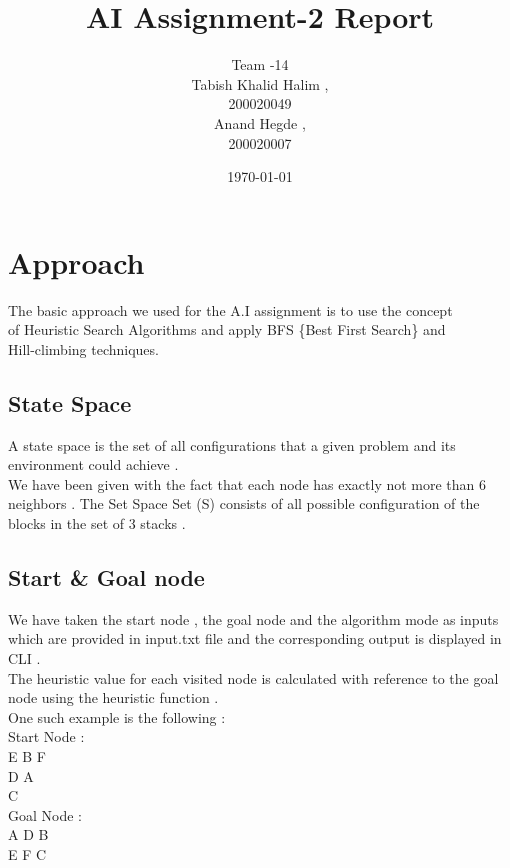 \documentclass{article}
\title{AI Assignment-2 Report}
\date{\today}
\author{Team -14 \\Tabish Khalid Halim , \\ 200020049 \\ Anand Hegde , \\ 200020007}
\affil{Department of Computer Science, IIT Dharwad}
\begin{document}
\maketitle
{}
\newpage
\tableofcontents

\newpage
{}
\section{Approach}
The basic approach we used for the A.I assignment is to use the concept \\of Heuristic Search Algorithms and 
apply BFS \{Best First Search\} and \\Hill-climbing techniques.
\vspace{10pt}
\subsection*{State Space}
A state space is the set of all configurations that a given problem and its \\environment could achieve .
\vspace{10pt}
\\We have been given with the fact that each node has exactly not more than 6 neighbors .
The Set Space Set (S) consists of all possible configuration of the
blocks in the set of 3 stacks .
\subsection*{Start \& Goal node}
We have taken the start node , the goal node and the algorithm mode as inputs which are provided in input.txt file 
and the corresponding output is displayed in CLI .
\vspace{10pt}
\\The heuristic value for each visited node is calculated with reference to the goal node using the heuristic function .
\vspace{10pt}
\\One such example is the following :
\\Start Node :
\\\hspace*{10pt}E B F
\\\hspace*{10pt}D A 
\\\hspace*{10pt}C
\\Goal Node :
\\\hspace*{10pt}A D B
\\\hspace*{10pt}E F C
\newpage
\end{document}
